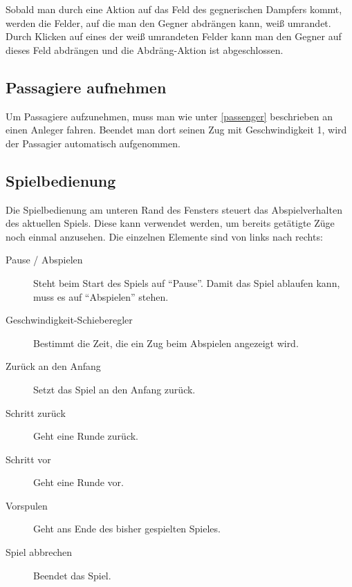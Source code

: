 \documentclass[12pt,a4paper, ngerman, oneside]{scrartcl}
\begin{document}
Sobald man durch eine Aktion auf das Feld des gegnerischen Dampfers kommt,
werden die Felder, auf die man den Gegner abdrängen kann, weiß umrandet. Durch
Klicken auf eines der weiß umrandeten Felder kann man den Gegner auf dieses Feld
abdrängen und die Abdräng-Aktion ist abgeschlossen.

\subsection{Passagiere aufnehmen}

Um Passagiere aufzunehmen, muss man wie unter \ref{passenger} beschrieben an
einen Anleger fahren. Beendet man dort seinen Zug mit Geschwindigkeit 1, wird
der Passagier automatisch aufgenommen.

\subsection{Spielbedienung}

Die Spielbedienung am unteren Rand des Fensters steuert das Abspielverhalten des
aktuellen Spiels. Diese kann verwendet werden, um bereits getätigte Züge
noch einmal anzusehen. Die einzelnen Elemente sind von links nach rechts:

\begin{description}
\item [Pause / Abspielen] Steht beim Start des Spiels auf ``Pause''. Damit das Spiel ablaufen kann, muss es auf ``Abspielen'' stehen.
\item [Geschwindigkeit-Schieberegler] Bestimmt die Zeit, die ein Zug beim Abspielen angezeigt wird.
\item [Zurück an den Anfang] Setzt das Spiel an den Anfang zurück.
\item [Schritt zurück] Geht eine Runde zurück.
\item [Schritt vor] Geht eine Runde vor.
\item [Vorspulen] Geht ans Ende des bisher gespielten Spieles.
\item [Spiel abbrechen] Beendet das Spiel.
\end{description}
\end{document}
